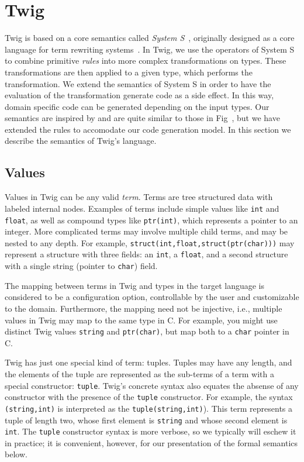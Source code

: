 
\section{Twig}
\label{sec:semantics}

Twig is based on a core semantics called \emph{System S}~\cite{system-s}, originally designed as a core language for term rewriting systems~\cite{baader98rewriting}. In Twig, we use the operators of System S to combine primitive \emph{rules} into more complex transformations on types. These transformations are then applied to a given type, which performs the transformation. We extend the semantics of System S in order to have the evaluation of the transformation generate code as a side effect. In this way, domain specific code can be generated depending on the input types. Our semantics are inspired by and are quite similar to those in Fig~\cite{fig}, but we have extended the rules to accomodate our code generation model. In this section we describe the semantics of Twig's language.

\subsection{Values}

Values in Twig can be any valid \emph{term}. Terms are tree structured data with labeled internal nodes. Examples of terms include simple values like \texttt{int} and \texttt{float}, as well as compound types like \texttt{ptr(int)}, which represents a pointer to an integer. More complicated terms may involve multiple child terms, and may be nested to any depth. For example, \texttt{struct(int,float,struct(ptr(char)))} may represent a structure with three fields: an \texttt{int}, a \texttt{float}, and a second structure with a single string (pointer to \texttt{char}) field.

The mapping between terms in Twig and types in the target language is considered to be a configuration option, controllable by the user and customizable to the domain. Furthermore, the mapping need not be injective, i.e., multiple values in Twig may map to the same type in C. For example, you might use distinct Twig values \texttt{string} and \texttt{ptr(char)}, but map both to a \texttt{char} pointer in C.

Twig has just one special kind of term: tuples. Tuples may have any length, and the elements of the tuple are represented as the sub-terms of a term with a special constructor: \texttt{tuple}. Twig's concrete syntax also equates the absense of any constructor with the presence of the \texttt{tuple} constructor. For example, the syntax \texttt{(string,int)} is interpreted as the \texttt{tuple(string,int)}). This term represents a tuple of length two, whose first element is \texttt{string} and whose second element is \texttt{int}. The \texttt{tuple} constructor syntax is more verbose, so we typically will eschew it in practice; it is convenient, however, for our presentation of the formal semantics below.

